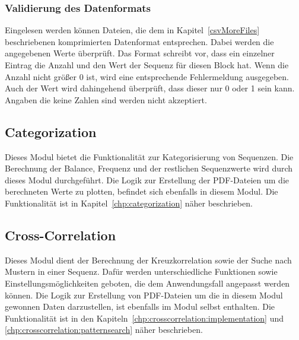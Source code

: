 \subsubsection{Validierung des Datenformats}
Eingelesen werden können Dateien, die dem in Kapitel~\ref{csvMoreFiles} beschriebenen komprimierten Datenformat entsprechen.
Dabei werden die angegebenen Werte überprüft.
Das Format schreibt vor, dass ein einzelner Eintrag die Anzahl und den Wert der Sequenz für diesen Block hat.
Wenn die Anzahl nicht größer 0 ist, wird eine entsprechende Fehlermeldung ausgegeben.
Auch der Wert wird dahingehend überprüft, dass dieser nur 0 oder 1 sein kann.
Angaben die keine Zahlen sind werden nicht akzeptiert. 

\subsection{Categorization}
Dieses Modul bietet die Funktionalität zur Kategorisierung von Sequenzen.
Die Berechnung der Balance, Frequenz und der restlichen Sequenzwerte wird durch dieses Modul durchgeführt.
Die Logik zur Erstellung der PDF-Dateien um die berechneten Werte zu plotten, befindet sich ebenfalls in diesem Modul.
Die Funktionalität ist in Kapitel~\ref{chp:categorization} näher beschrieben.

\subsection{Cross-Correlation}
Dieses Modul dient der Berechnung der Kreuzkorrelation sowie der Suche nach Mustern in einer Sequenz.
Dafür werden unterschiedliche Funktionen sowie Einstellungsmöglichkeiten geboten, die dem Anwendungsfall angepasst werden können.
Die Logik zur Erstellung von PDF-Dateien um die in diesem Modul gewonnen Daten darzustellen, ist ebenfalls im Modul selbst enthalten.
Die Funktionalität ist in den Kapiteln~\ref{chp:crosscorrelation:implementation} und \ref{chp:crosscorrelation:patternsearch} näher beschrieben.
